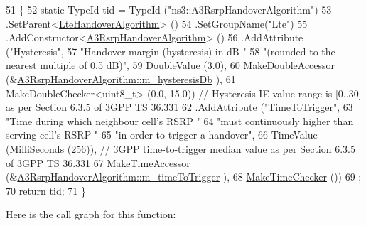 \begin{DoxyCode}
51 \{
52   \textcolor{keyword}{static} TypeId tid = TypeId (\textcolor{stringliteral}{"ns3::A3RsrpHandoverAlgorithm"})
53     .SetParent<\hyperlink{classns3_1_1LteHandoverAlgorithm_acb457c6d2a93677efd36a65376ce31fc}{LteHandoverAlgorithm}> ()
54     .SetGroupName(\textcolor{stringliteral}{"Lte"})
55     .AddConstructor<\hyperlink{classns3_1_1A3RsrpHandoverAlgorithm_a6e4ba38b97c939d2f85e570d77f2905d}{A3RsrpHandoverAlgorithm}> ()
56     .AddAttribute (\textcolor{stringliteral}{"Hysteresis"},
57                    \textcolor{stringliteral}{"Handover margin (hysteresis) in dB "}
58                    \textcolor{stringliteral}{"(rounded to the nearest multiple of 0.5 dB)"},
59                    DoubleValue (3.0),
60                    MakeDoubleAccessor (&\hyperlink{classns3_1_1A3RsrpHandoverAlgorithm_a2554a9c093c29f93f40efd6778d12a75}{A3RsrpHandoverAlgorithm::m\_hysteresisDb}
      ),
61                    MakeDoubleChecker<uint8\_t> (0.0, 15.0)) \textcolor{comment}{// Hysteresis IE value range is [0..30] as per
       Section 6.3.5 of 3GPP TS 36.331}
62     .AddAttribute (\textcolor{stringliteral}{"TimeToTrigger"},
63                    \textcolor{stringliteral}{"Time during which neighbour cell's RSRP "}
64                    \textcolor{stringliteral}{"must continuously higher than serving cell's RSRP "}
65                    \textcolor{stringliteral}{"in order to trigger a handover"},
66                    TimeValue (\hyperlink{group__timecivil_gaf26127cf4571146b83a92ee18679c7a9}{MilliSeconds} (256)), \textcolor{comment}{// 3GPP time-to-trigger median value as per
       Section 6.3.5 of 3GPP TS 36.331}
67                    MakeTimeAccessor (&\hyperlink{classns3_1_1A3RsrpHandoverAlgorithm_a5158741f07ce566b8efc01f5e798ae78}{A3RsrpHandoverAlgorithm::m\_timeToTrigger}
      ),
68                    \hyperlink{group__time_ga7032965bd4afa578691d88c09e4481c1}{MakeTimeChecker} ())
69   ;
70   \textcolor{keywordflow}{return} tid;
71 \}
\end{DoxyCode}


Here is the call graph for this function\+:


